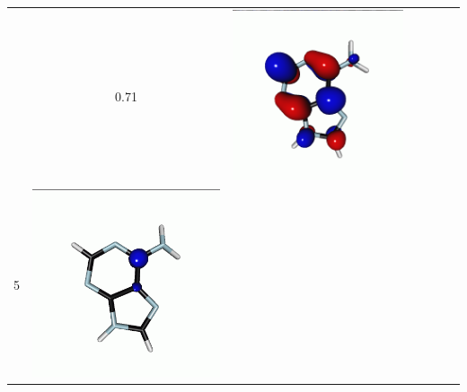 \documentclass[journal=jctcce,manuscript=article]{achemso}
\begin{document}
\begin{table}[H]
\begin{tabular}{ l| c c c | c c c }
\begin{minipage}{0.2\textwidth}
    \end{minipage}
    & 0.71
    & 
    \begin{minipage}{0.2\textwidth}
        \centering
        \includegraphics[scale=0.10]{NTO/Adenine_C/3p_Cs.png}
    \end{minipage}
    \\
            5 &  
    \begin{minipage}{0.2\textwidth}
        \centering
        \includegraphics[scale=0.10]{NTO/Adenine_C/5h_C1.png}

\end{minipage}
\end{tabular}
\end{table}
\end{document}
